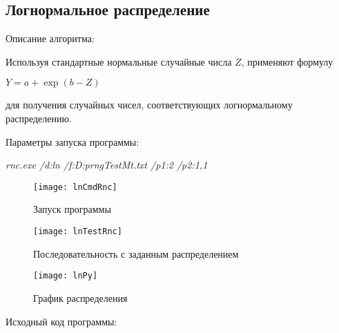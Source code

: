 \documentclass[bachelor, och, coursework]{shiza}
\begin{document}
	
	\subsection{Логнормальное распределение}

	Описание алгоритма:

	Используя стандартные нормальные случайные числа $Z$, применяют формулу
	
	\begin{center}
		$ Y = a + \exp(b - Z) $
	\end{center}
	
	для получения случайных чисел, соответствующих логнормальному распределению. \
	
	Параметры запуска программы:
	
	\textit{rnc.exe /d:ln /f:D:prngTestMt.txt /p1:2 /p2:1,1}
	
	
	\begin{figure}[H]
		\centering
		\texttt{[image: lnCmdRnc]}
		\caption{Запуск программы}
		\label{fig:lnCmdRnc}
	\end{figure}
	
	\begin{figure}[H]
		\centering
		\texttt{[image: lnTestRnc]}
		\caption{Последовательность с заданным распределением}
		\label{fig:lnTestRnc}
	\end{figure}
	
	\begin{figure}[H]
		\centering
		\texttt{[image: lnPy]}
		\caption{График распределения}
		\label{fig:lnPy}
	\end{figure}
	
	Исходный код программы:
	
\end{document}
